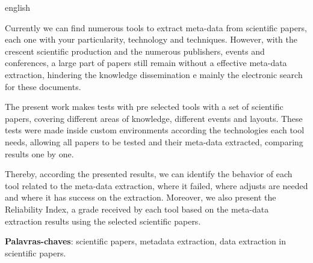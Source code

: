 \begin{resumo}[Abstract]
\begin{otherlanguage*}{english}

Currently we can find numerous tools to extract meta-data from scientific papers, each one with your particularity, technology and techniques. However, with the crescent scientific production and the numerous publishers, events and conferences, a large part of papers still remain without a effective meta-data extraction, hindering the knowledge dissemination e mainly the electronic search for these documents.

The present work makes tests with pre selected tools with a set of scientific papers, covering different areas of knowledge, different events and layouts. These tests were made inside custom environments according the technologies each tool needs, allowing all papers to be tested and their meta-data extracted, comparing results one by one.

Thereby, according the presented results, we can identify the behavior of each tool related to the meta-data extraction, where it failed, where adjusts are needed and where it has success on the extraction. Moreover, we also present the Reliability Index, a grade received by each tool based on the meta-data extraction results using the selected scientific papers.

\textbf{Palavras-chaves}: scientific papers, metadata extraction, data extraction in scientific papers.


\end{otherlanguage*}
\end{resumo}

 

  

